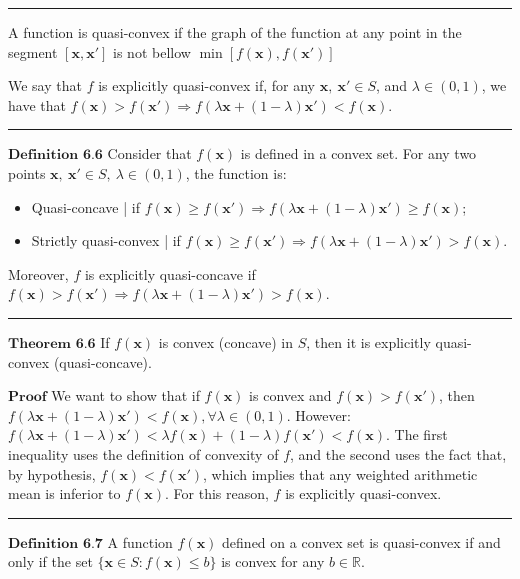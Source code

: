 \documentclass[0pt, a4paper]{article}
\begin{document}
\noindent\rule{\textwidth}{1pt}

A function is quasi-convex if the graph of the function at any point in the segment $[\textbf{x},\textbf{x}']$ is not bellow $\min\left[f(\textbf{x}),f(\textbf{x}')\right]$

We say that $f$ is explicitly quasi-convex if, for any $\textbf{x},\ \textbf{x}'\in S$, and $\lambda\in(0,1)$, we have that $f(\textbf{x})>f(\textbf{x}')\Rightarrow f(\lambda\textbf{x}+(1-\lambda)\textbf{x}')<f(\textbf{x})$.

\noindent\rule{\textwidth}{1pt}

$\textbf{Definition 6.6}$ Consider that $f(\textbf{x})$ is defined in a convex set. For any two points $\textbf{x},\ \textbf{x}'\in S,\ \lambda\in(0,1)$, the function is:
\begin{itemize}
	\item Quasi-concave | if $f(\textbf{x})\geq  f(\textbf{x}')\Rightarrow f(\lambda\textbf{x}+(1-\lambda)\textbf{x}')\geq f(\textbf{x})$;
	\item Strictly quasi-convex | if $f(\textbf{x})\geq f(\textbf{x}')\Rightarrow f(\lambda\textbf{x}+(1-\lambda)\textbf{x}')> f(\textbf{x})$.
\end{itemize}
Moreover, $f$ is explicitly quasi-concave if $f(\textbf{x})> f(\textbf{x}')\Rightarrow f(\lambda\textbf{x}+(1-\lambda)\textbf{x}')> f(\textbf{x})$.

\noindent\rule{\textwidth}{1pt}

$\textbf{Theorem 6.6}$ If $f(\textbf{x})$ is convex (concave) in $S$, then it is explicitly quasi-convex (quasi-concave).

$\textbf{Proof}$ We want to show that if $f(\textbf{x})$ is convex and $f(\textbf{x})>f(\textbf{x}')$, then $f(\lambda\textbf{x}+(1-\lambda)\textbf{x}')<f(\textbf{x}),
 \forall\lambda\in(0,1)$. However: $f(\lambda\textbf{x}+(1-\lambda)\textbf{x}')<\lambda f(\textbf{x})+(1-\lambda)f(\textbf{x}')<f(\textbf{x})$. The first inequality uses the definition of convexity of $f$, and the second uses the fact that, by hypothesis, $f(\textbf{x})<f(\textbf{x}')$, which implies that any weighted arithmetic mean is inferior to $f(\textbf{x})$. For this reason, $f$ is explicitly quasi-convex.
 
 
\noindent\rule{\textwidth}{1pt}

$\textbf{Definition 6.7}$ A function $f(\textbf{x})$ defined on a convex set is quasi-convex if and only if the set $\{\textbf{x}\in S: f(\textbf{x})\leq b\}$ is convex for any $b\in\mathbb{R}$.
\end{document}

